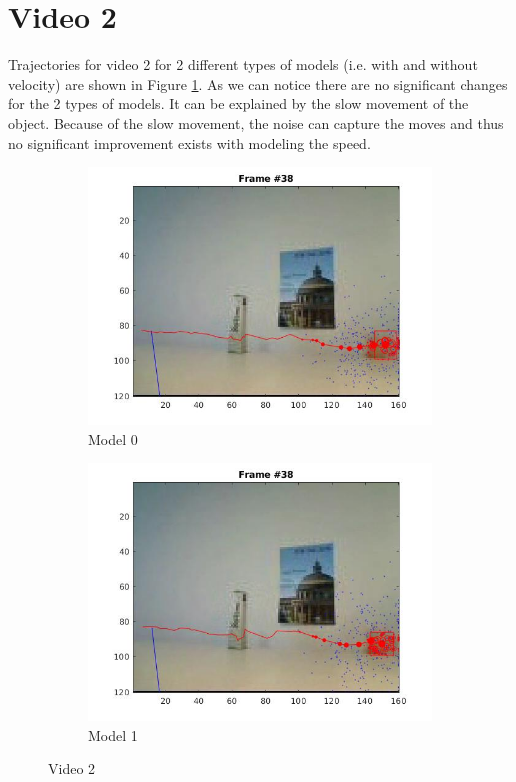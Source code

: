 \documentclass[paper=a4, fontsize=11pt]{scrartcl} %
\numberwithin{equation}{section} %
\numberwithin{figure}{section} %
\numberwithin{table}{section} %
\begin{document}
\section{Video 2}

Trajectories for video 2 for 2 different types of models (i.e. with and without velocity) are shown in Figure \ref{fig:v2_model}. As we can notice there are no significant changes for the 2 types of models. It can be explained by the slow movement of the object. Because of the slow movement, the noise can capture the moves and thus no significant improvement exists with modeling the speed.

\begin{figure}
\centering
\begin{subfigure}{.5\textwidth}
  \centering
  \includegraphics[width=.9\linewidth]{video20.jpg}
  \caption{Model 0}
\end{subfigure}%
\begin{subfigure}{.5\textwidth}
  \centering
  \includegraphics[width=.9\linewidth]{video21.jpg}
  \caption{Model 1}
\end{subfigure}
\caption{Video 2}
\label{fig:v2_model}
\end{figure}
\end{document}
